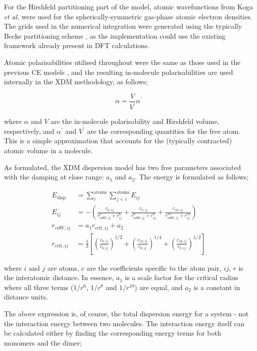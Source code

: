 \documentclass[preprint]{iucr}              %
\begin{document}
For the Hirshfeld \cite{Hirshfeld1977} partitioning part of the model, atomic wavefunctions 
from Koga \textit{et al.} \cite{Koga1993,Koga2000} were used
for the spherically-symmetric gas-phase atomic electron densities.
The grids used in the numerical integration were generated using the typically Becke partitioning 
scheme \cite{Becke1988}, as the implementation could use the existing framework already present in DFT calculations. 

Atomic polarisabilities utilised throughout were the same as those used in the previous CE models \cite{Turner2014}, and the 
resulting in-molecule polarisabilities are used internally in the XDM methodology, as follows;

\begin{equation}
    \label{eqn:pol_in_mol}
    \alpha = \frac{V}{V^\prime} \alpha^\prime
\end{equation}

where $\alpha$ and $V$ are the in-molecule polarisability and Hirshfeld volume, respectively, and
$\alpha^\prime$ and $V^\prime$ are the corresponding quantities for the free atom.
This is a simple approximation that accounts for the (typically contracted) atomic volume in a molecule.

As formulated, the XDM dispersion model has two free parameters associated with the damping at close range: $a_1$ and $a_2$.
The energy is formulated as follows;

\begin{align}
    \label{eqn:xdm_energy}
    E_\text{disp} &= \sum_i^\text{atoms} \sum_{j<i}^\text{atoms} E_{ij}\\
    E_{ij} &= - (\frac{c_{6,ij}}{r^6_{vdW,ij} + r^6_{ij}} + \frac{c_{8,ij}}{r^8_{vdW,ij} + r^8_{ij}} + \frac{c_{10,ij}}{r^{10}_{vdW,ij} + r^{10}_{ij}})\\
    r_{vdW,ij} &= a_1 r_{\text{crit},ij} + a_2\\
    r_{\text{crit},ij} &= \frac{1}{3}[(\frac{c_{8,ij}}{c_{6,ij}})^{1/2} + (\frac{c_{10,ij}}{c_{6,ij}})^{1/4} + (\frac{c_{10,ij}}{c_{8,ij}})^{1/2}]
\end{align}


where $i$ and $j$ are atoms, $c$ are the coefficients specific to the atom pair, ${ij}$, $r$ is the interatomic distance.
In essence, $a_1$ is a scale factor for the critical radius where all three terms ($1/r^6$, $1/r^8$ and $1/r^{10}$) are equal,
and $a_2$ is a constant in distance units.

The above expression is, of course, the total dispersion energy for a system - not the interaction energy between two molecules. The
interaction energy itself can be calculated either by finding the corresponding energy terms for both monomers and the dimer;
\end{document}
